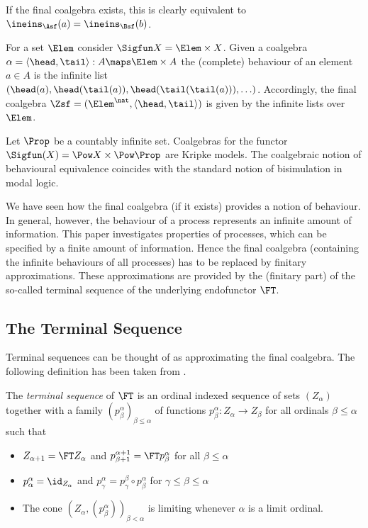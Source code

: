 \documentclass{entcs}
\begin{document}
If the final coalgebra exists, this is clearly equivalent to 
$\ineins_\Asf(a)=\ineins_\Bsf(b)$.

\begin{example}[Streams]
  For a set $\Elem$ consider $\Sigfun X=\Elem\times X$. Given a coalgebra
  $\alpha=\langle\head,\tail\rangle: A\maps\Elem\times A$ the (complete)
  behaviour of an element $a\in A$ is the infinite list
  $(\head(a),\head(\tail(a)),\head(\tail(\tail(a))),\ldots)$. Accordingly, the
  final coalgebra $\Zsf=(\Elem^\nat,\langle\head,\tail\rangle)$ is given by the
  infinite lists over $\Elem$.
\end{example}

\begin{example}
  Let $\Prop$ be a countably infinite set. Coalgebras for the functor
  $\Sigfun(X)=\Pow X\times \Pow\Prop$ are Kripke models. The coalgebraic
  notion of behavioural equivalence coincides with the standard notion of
  bisimulation in modal logic.
\end{example}


We have seen how the final coalgebra (if it exists) provides a notion
of behaviour. In general, however, the behaviour of a process
represents an infinite amount of information.  This paper investigates
properties of processes, which can be specified by a finite amount of
information. Hence the final coalgebra (containing the infinite
behaviours of all processes) has to be replaced by finitary
approximations. These approximations are provided by the (finitary
part) of the so-called terminal sequence of the underlying endofunctor
$\FT$.

\subsection{The Terminal Sequence}

Terminal sequences can be thought of as approximating the final
coalgebra.  The following definition has been taken from
\cite{worrell:cmcs99}.

The \emph{terminal sequence} of $\FT$ is an ordinal indexed sequence of sets
$(Z_{\alpha})$ together with a family $(p^{\alpha}_{\beta})_{\beta \leq
\alpha}$ of functions $p^{\alpha}_{\beta}: Z_{\alpha} \to Z_{\beta}$ for all
ordinals $\beta \leq \alpha$ such that
\begin{itemize}
\item $Z_{\alpha+1} = \FT Z_{\alpha}$ and $p^{\alpha+1}_{\beta+1} = \FT
p^{\alpha}_{\beta}$ for all $\beta \leq \alpha$
\item
  $p^{\alpha}_{\alpha} = \id_{Z_{\alpha}}$ and $p^{\alpha}_{\gamma} =
        p^{\beta}_{\gamma} \circ p^{\alpha}_{\beta}$ for $\gamma \leq \beta \leq
        \alpha$
\item
  The cone $(Z_{\alpha}, (p^{\alpha}_{\beta}))_{\beta < \alpha}$ is limiting
        whenever $\alpha$ is a limit ordinal.
\end{itemize}
\end{document}

